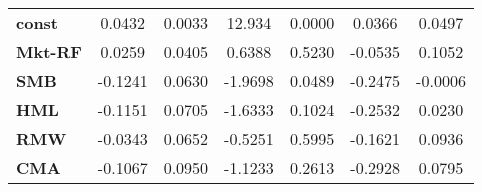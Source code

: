 \begin{center}
\begin{tabular}{lcccccc}
\midrule
\textbf{const}  &       0.0432       &       0.0033       &      12.934     &      0.0000      &       0.0366      &       0.0497       \\
\textbf{Mkt-RF} &       0.0259       &       0.0405       &      0.6388     &      0.5230      &      -0.0535      &       0.1052       \\
\textbf{SMB}    &      -0.1241       &       0.0630       &     -1.9698     &      0.0489      &      -0.2475      &      -0.0006       \\
\textbf{HML}    &      -0.1151       &       0.0705       &     -1.6333     &      0.1024      &      -0.2532      &       0.0230       \\
\textbf{RMW}    &      -0.0343       &       0.0652       &     -0.5251     &      0.5995      &      -0.1621      &       0.0936       \\
\textbf{CMA}    &      -0.1067       &       0.0950       &     -1.1233     &      0.2613      &      -0.2928      &       0.0795       \\
\bottomrule
\end{tabular}
\end{center}
